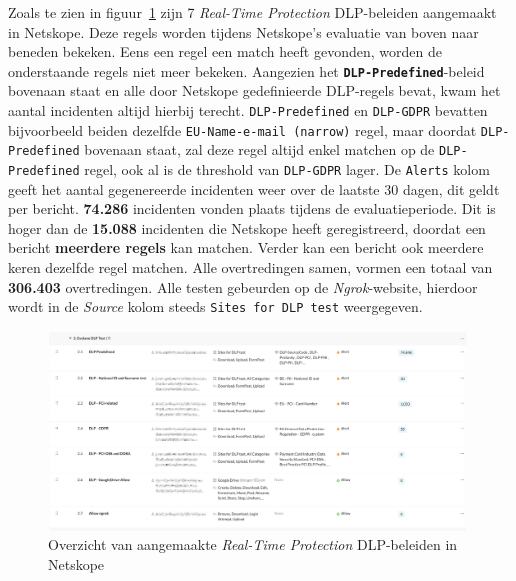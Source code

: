 Zoals te zien in figuur~\ref{fig:netskope_rules} zijn 7 \textit{Real-Time Protection} DLP-beleiden aangemaakt in Netskope. 
Deze regels worden tijdens Netskope's evaluatie van boven naar beneden bekeken.
Eens een regel een match heeft gevonden, worden de onderstaande regels niet meer bekeken.
Aangezien het \textbf{\texttt{DLP-Predefined}}-beleid bovenaan staat en alle door Netskope gedefinieerde DLP-regels bevat, kwam het aantal incidenten altijd hierbij terecht.
\texttt{DLP-Predefined} en \texttt{DLP-GDPR} bevatten bijvoorbeeld beiden dezelfde \texttt{EU-Name-e-mail (narrow)} regel, maar doordat \texttt{DLP-Predefined} bovenaan staat, zal deze regel altijd enkel matchen op de \texttt{DLP-Predefined} regel,
ook al is de threshold van \texttt{DLP-GDPR} lager.
De \texttt{Alerts} kolom geeft het aantal gegenereerde incidenten weer over de laatste 30 dagen, dit geldt per bericht.
\textbf{74.286} incidenten vonden plaats tijdens de evaluatieperiode. Dit is hoger dan de \textbf{15.088} incidenten die Netskope heeft geregistreerd, doordat een bericht \textbf{meerdere regels} kan matchen.
Verder kan een bericht ook meerdere keren dezelfde regel matchen.
Alle overtredingen samen, vormen een totaal van \textbf{306.403} overtredingen.
Alle testen gebeurden op de \textit{Ngrok}-website, hierdoor wordt in de \textit{Source} kolom steeds \texttt{Sites for DLP test} weergegeven.


\begin{figure}[H]
    \centering
    \scriptsize
    \includegraphics[width=0.99\textwidth]{img/netskope_rules.png}
    \caption{Overzicht van aangemaakte \textit{Real-Time Protection} DLP-beleiden in Netskope}
    \label{fig:netskope_rules}
\end{figure}








